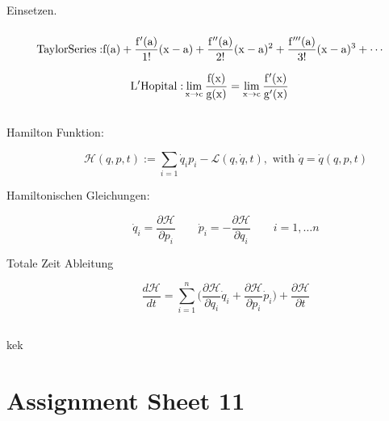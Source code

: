 \documentclass{report}
\newcommand{\lag}{\mathcal{L}}
\newcommand{\ham}{\mathcal{H}}
\newcommand{\prt}[2]{\frac{\partial #1}{\partial #2}}
\begin{document}
\subsection{}
Einsetzen.

\subsection{}
$$\rm{Taylor Series: }{f(a)+{\frac {f'(a)}{1!}}(x-a)+{\frac{f''(a)}{2!}}(x-a)^{2}+{\frac{f'''(a)}{3!}}(x-a)^{3}+\cdots}$$

$$\rm{L'Hopital: }\lim_{x\rightarrow c}\frac{f(x)}{g(x)}= \lim_{x\rightarrow c}\frac{f'(x)}{g'(x)}$$


\section{}
\begin{description}
\item [Hamilton Funktion:]
$$\ham(q,p,t):={\sum_{i=1}\dot q_i p_i}- \lag( q , \dot q , t ) ,  \textrm{ with  }\dot q = \dot q ( q , p , t )$$
\item [Hamiltonischen Gleichungen:]
$$\dot q_i = \frac{\partial \ham}{\partial p_i} \qquad \dot p_i = -\frac{\partial\ham}{\partial q_i} \qquad i = 1, \dots n$$
\item [Totale Zeit Ableitung]
$$\frac{d \ham}{dt} = \sum_{i=1}^{n} \bigg ( \prt{\ham}{q_i} \dot q_i + \prt{\ham}{p_i} \dot p_i \bigg ) + \prt{\ham}{t}$$
\end{description}
\section{}

kek

\chapter{Assignment Sheet 11}
\end{document}
